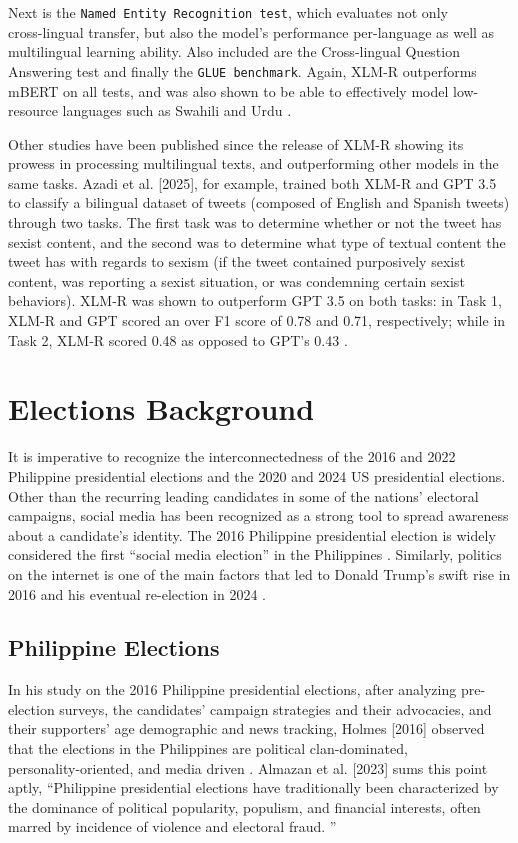 Next is the \texttt{Named Entity Recognition test}, which evaluates not only\\cross-lingual transfer, but also the model’s performance per-language as well as multilingual learning ability. Also included are the Cross-lingual Question Answering test and finally the \texttt{GLUE benchmark}. Again, XLM-R outperforms mBERT on all tests, and was also shown to be able to effectively model low-resource languages such as Swahili and Urdu \cite{RRL_Conneau-2020}.

Other studies have been published since the release of XLM-R showing its prowess in processing multilingual texts, and outperforming other models in the same tasks. Azadi et al. [2025], for example, trained both XLM-R and GPT 3.5 to classify a bilingual dataset of tweets (composed of English and Spanish tweets) through two tasks. The first task was to determine whether or not the tweet has sexist content, and the second was to determine what type of textual content the tweet has with regards to sexism (if the tweet contained purposively sexist content, was reporting a sexist situation, or was condemning certain sexist behaviors). XLM-R was shown to outperform GPT 3.5 on both tasks: in Task 1, XLM-R and GPT scored an over F1 score of 0.78 and 0.71, respectively; while in Task 2, XLM-R scored 0.48 as opposed to GPT’s 0.43 \cite{RRL_Azadi-2025}.

\section{Elections Background}
It is imperative to recognize the interconnectedness of the 2016 and 2022 Philippine presidential elections and the 2020 and 2024 US presidential elections. Other than the recurring leading candidates in some of the nations’ electoral campaigns, social media has been recognized as a strong tool to spread awareness about a candidate’s identity. The 2016 Philippine presidential election is widely considered the first “social media election” in the Philippines \cite{RRL_Sinpeng-2020}. Similarly, politics on the internet is one of the main factors that led to Donald Trump’s swift rise in 2016 and his eventual re-election in 2024 \cite{RRL_Posada-2025}.

\subsection{Philippine Elections}
In his study on the 2016 Philippine presidential elections, after analyzing pre-election surveys, the candidates' campaign strategies and their advocacies, and their supporters' age demographic and news tracking, Holmes [2016] observed that the elections in the Philippines are political clan-dominated, \\personality-oriented, and media driven \cite{RRL_Holmes-2016}. Almazan et al. [2023] sums this point aptly, “Philippine presidential elections have traditionally been characterized by the dominance of political popularity, populism, and financial interests, often marred by incidence of violence and electoral fraud. \cite{RRL_Almazan-2023}”

